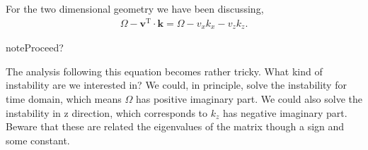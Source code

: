 \documentclass[letterpaper,12pt,english]{sphinxmanual}
\begin{document}
For the two dimensional geometry we have been discussing,
\begin{equation*}
\begin{split}\Omega - \mathbf v^{\mathrm T}\cdot \mathbf k = \Omega- v_x k_x -v_z k_z.\end{split}
\end{equation*}
\begin{sphinxadmonition}{note}{Proceed?}

The analysis following this equation becomes rather tricky. What kind of instability are we interested in? We could, in principle, solve the instability for time domain, which means \(\Omega\) has positive imaginary part. We could also solve the instability in z direction, which corresponds to \(k_z\) has negative imaginary part. Beware that these are related the eigenvalues of the matrix though a sign and some constant.
\end{sphinxadmonition}
\end{document}
